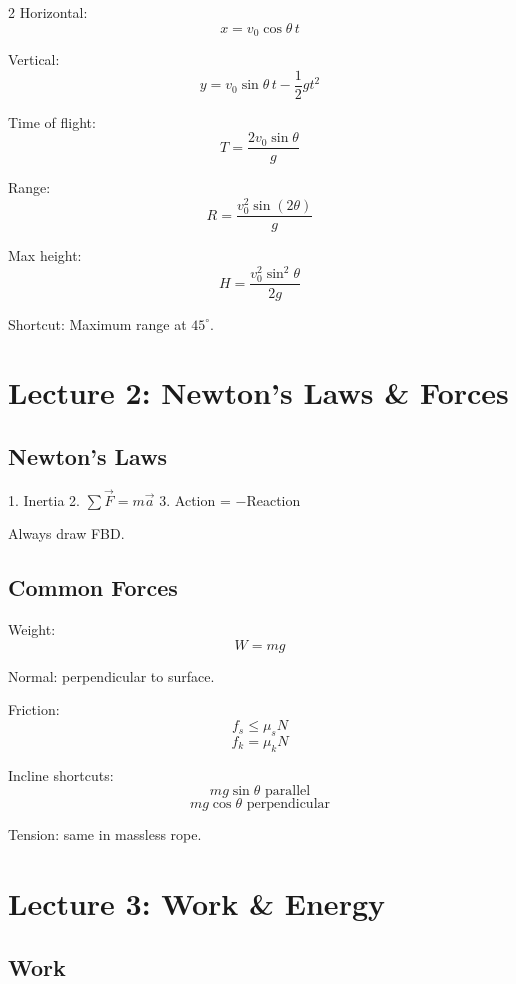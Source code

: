 \documentclass[10pt,landscape]{article}
\begin{document}
\begin{multicols}{2}
Horizontal:
\[
x = v_0\cos\theta \, t
\]

Vertical:
\[
y = v_0\sin\theta \, t - \frac{1}{2}gt^2
\]

Time of flight:
\[
T = \frac{2v_0\sin\theta}{g}
\]

Range:
\[
R = \frac{v_0^2\sin(2\theta)}{g}
\]

Max height:
\[
H = \frac{v_0^2\sin^2\theta}{2g}
\]

Shortcut: Maximum range at $45^\circ$.


\section*{Lecture 2: Newton's Laws \& Forces}

\subsection*{Newton's Laws}

1. Inertia  
2. $\sum \vec{F} = m\vec{a}$  
3. Action = $-$Reaction  

Always draw FBD.

\subsection*{Common Forces}

Weight:
\[
W = mg
\]

Normal: perpendicular to surface.

Friction:
\[
f_s \le \mu_s N
\]
\[
f_k = \mu_k N
\]

Incline shortcuts:
\[
mg\sin\theta \text{ parallel}
\]
\[
mg\cos\theta \text{ perpendicular}
\]

Tension: same in massless rope.


\section*{Lecture 3: Work \& Energy}

\subsection*{Work}


\end{multicols}
\end{document}
